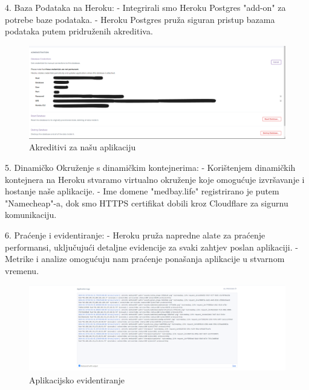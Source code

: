 4. Baza Podataka na Heroku:
   - Integrirali smo Heroku Postgres "add-on" za potrebe baze podataka.
   - Heroku Postgres pruža siguran pristup bazama podataka putem pridruženih akreditiva.
   \begin{figure}[H]
       \centering
       \includegraphics[width=1\linewidth]{slike/credentials.png}
       \caption{Akreditivi za našu aplikaciju}
       \label{fig:enter-label}
   \end{figure}

5. Dinamičko Okruženje s  dinamičkim kontejnerima:
   - Korištenjem dinamičkih kontejnera na Heroku stvaramo virtualno okruženje koje omogućuje izvršavanje i hostanje naše aplikacije.
   - Ime domene "medbay.life" registrirano je putem "Namecheap"-a, dok smo HTTPS certifikat dobili kroz Cloudflare za sigurnu komunikaciju.

6. Praćenje i evidentiranje:
   - Heroku pruža napredne alate za praćenje performansi, uključujući detaljne evidencije za svaki zahtjev poslan aplikaciji.
   - Metrike i analize omogućuju nam praćenje ponašanja aplikacije u stvarnom vremenu.
   \begin{figure}[H]
       \centering
       \includegraphics[width=1\linewidth]{slike/appLogs.png}
       \caption{Aplikacijsko evidentiranje}
       \label{fig:enter-label}
   \end{figure}


